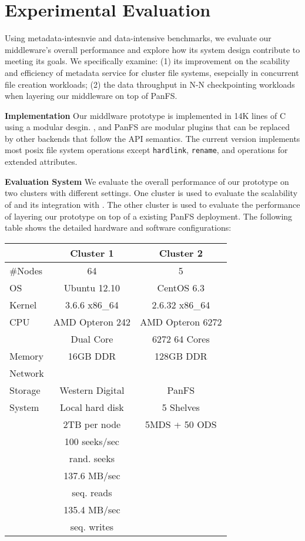 \section{Experimental Evaluation}

Using metadata-intesnvie and data-intensive benchmarks,
we evaluate our middleware's overall performance
and explore how its system design contribute to meeting its goals.
We specifically examine: (1) its improvement on the scability and
efficiency of metadata service for cluster file systems,
esepcially in concurrent file creation workloads;
(2) the data throughput in N-N checkpointing workloads
when layering our middleware on top of PanFS.

\textbf{Implementation}
Our middlware prototype is implemented in 14K lines of C using a modular desgin.
\tfs, \ldb and PanFS are modular plugins that can be replaced by other backends
that follow the API semantics. The current version implements most posix
file system operations except \texttt{hardlink}, \texttt{rename},
and operations for extended attributes.

\textbf{Evaluation System }
We evaluate the overall performance of our prototype
on two clusters with different settings.
One cluster is used to evaluate the scalability of \tfs and its integration with \giga.
The other cluster is used to evaluate the performance of layering our
prototype on top of a existing PanFS deployment.
The following table shows the detailed hardware and software configurations:

\begin{center}
\begin{tabular}{lcc}
\toprule
      & Cluster 1 & Cluster 2 \\
\midrule
\#Nodes & 64  &  5 \\
\hline
OS & Ubuntu 12.10  &   CentOS 6.3  \\
Kernel & 3.6.6 x86\_64 & 2.6.32 x86\_64\\
\hline
CPU & AMD Opteron 242   &  AMD Opteron 6272 \\
    & Dual Core & 6272 64 Cores\\
\hline
Memory & 16GB DDR &  128GB DDR \\
\hline
Network &       &           \\
\hline
Storage & Western Digital &  PanFS\\
System & Local hard disk &      5 Shelves \\
       &  2TB per node &   5MDS + 50 ODS \\
& 100 seeks/sec & \\
& rand. seeks        & \\
& 137.6 MB/sec & \\
& seq. reads      & \\
& 135.4 MB/sec & \\
& seq. writes      & \\
\bottomrule
\end{tabular}
\end{center}

